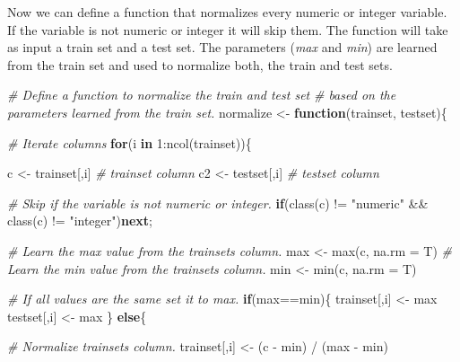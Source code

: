 \documentclass[
  11pt,
]{krantz}
\newenvironment{Shaded}{\begin{snugshade}}{\end{snugshade}}
\newcommand{\AttributeTok}[1]{\textcolor[rgb]{0.61,0.61,0.61}{#1}}
\newcommand{\CommentTok}[1]{\textcolor[rgb]{0.37,0.37,0.37}{\textit{#1}}}
\newcommand{\ControlFlowTok}[1]{\textcolor[rgb]{0.27,0.27,0.27}{\textbf{#1}}}
\newcommand{\DecValTok}[1]{\textcolor[rgb]{0.06,0.06,0.06}{#1}}
\newcommand{\FunctionTok}[1]{\textcolor[rgb]{0,0,0}{#1}}
\newcommand{\NormalTok}[1]{#1}
\newcommand{\OtherTok}[1]{\textcolor[rgb]{0.37,0.37,0.37}{#1}}
\newcommand{\SpecialCharTok}[1]{\textcolor[rgb]{0,0,0}{#1}}
\newcommand{\StringTok}[1]{\textcolor[rgb]{0.5,0.5,0.5}{#1}}
\begin{document}
Now we can define a function that normalizes every numeric or integer variable. If the variable is not numeric or integer it will skip them. The function will take as input a train set and a test set. The parameters (\emph{max} and \emph{min}) are learned from the train set and used to normalize both, the train and test sets.

\begin{Shaded}
\begin{Highlighting}[]
\CommentTok{\# Define a function to normalize the train and test set}
\CommentTok{\# based on the parameters learned from the train set.}
\NormalTok{normalize }\OtherTok{\textless{}{-}} \ControlFlowTok{function}\NormalTok{(trainset, testset)\{}
  
  \CommentTok{\# Iterate columns}
  \ControlFlowTok{for}\NormalTok{(i }\ControlFlowTok{in} \DecValTok{1}\SpecialCharTok{:}\FunctionTok{ncol}\NormalTok{(trainset))\{}
    
\NormalTok{    c }\OtherTok{\textless{}{-}}\NormalTok{ trainset[,i] }\CommentTok{\# trainset column}
\NormalTok{    c2 }\OtherTok{\textless{}{-}}\NormalTok{ testset[,i] }\CommentTok{\# testset column}
    
    \CommentTok{\# Skip if the variable is not numeric or integer.}
    \ControlFlowTok{if}\NormalTok{(}\FunctionTok{class}\NormalTok{(c) }\SpecialCharTok{!=} \StringTok{"numeric"} \SpecialCharTok{\&\&} \FunctionTok{class}\NormalTok{(c) }\SpecialCharTok{!=} \StringTok{"integer"}\NormalTok{)}\ControlFlowTok{next}\NormalTok{;}
    
    \CommentTok{\# Learn the max value from the trainset\textquotesingle{}s column.}
\NormalTok{    max }\OtherTok{\textless{}{-}} \FunctionTok{max}\NormalTok{(c, }\AttributeTok{na.rm =}\NormalTok{ T)}
    \CommentTok{\# Learn the min value from the trainset\textquotesingle{}s column.}
\NormalTok{    min }\OtherTok{\textless{}{-}} \FunctionTok{min}\NormalTok{(c, }\AttributeTok{na.rm =}\NormalTok{ T)}
    
    \CommentTok{\# If all values are the same set it to max.}
    \ControlFlowTok{if}\NormalTok{(max}\SpecialCharTok{==}\NormalTok{min)\{}
\NormalTok{      trainset[,i] }\OtherTok{\textless{}{-}}\NormalTok{ max}
\NormalTok{      testset[,i] }\OtherTok{\textless{}{-}}\NormalTok{ max}
\NormalTok{    \}}
    \ControlFlowTok{else}\NormalTok{\{}
      
      \CommentTok{\# Normalize trainset\textquotesingle{}s column.}
\NormalTok{      trainset[,i] }\OtherTok{\textless{}{-}}\NormalTok{ (c }\SpecialCharTok{{-}}\NormalTok{ min) }\SpecialCharTok{/}\NormalTok{ (max }\SpecialCharTok{{-}}\NormalTok{ min)}
      

\end{Highlighting}
\end{Shaded}
\end{document}
